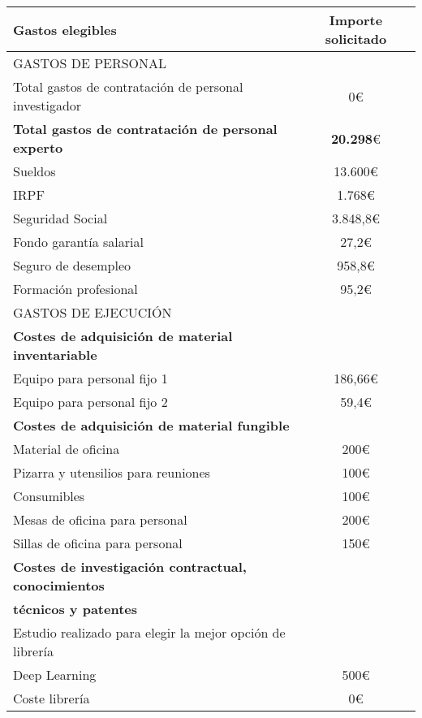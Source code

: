 \begin{table}[H]
	\begin{center}
		\begin{tabular}{|l|c|} \hline
		\cellcolor{red} Gastos elegibles & Importe solicitado \\
		\hline \hline
		\cellcolor[gray]{0.5}GASTOS DE PERSONAL &  \\ \hline
		Total gastos de contratación de personal investigador & 0\euro \\ \hline
		\cellcolor[gray]{0.8} \textbf{Total gastos de contratación de personal experto} & \textbf{20.298}\euro \\ \hline
		Sueldos & 13.600\euro \\ \hline
		IRPF & 1.768\euro \\ \hline
		Seguridad Social & 3.848,8\euro \\ \hline
		Fondo garantía salarial & 27,2\euro \\ \hline
		Seguro de desempleo &  958,8\euro \\ \hline
		Formación profesional & 95,2\euro \\ \hline
		\cellcolor[gray]{0.5}GASTOS DE EJECUCIÓN &  \\ \hline
		\cellcolor[gray]{0.8}\textbf{Costes de adquisición de material inventariable} &  \\ \hline
		Equipo para personal fijo 1 & 186,66\euro  \\ \hline
		Equipo para personal fijo 2 & 59,4\euro \\ \hline
		\cellcolor[gray]{0.8}\textbf{Costes de adquisición de material fungible} &  \\ \hline
		Material de oficina & 200\euro \\ \hline
		Pizarra y utensilios para reuniones & 100\euro \\ \hline
		Consumibles & 100\euro \\ \hline
		Mesas de oficina para personal &  200\euro \\ \hline
		Sillas de oficina para personal &  150\euro \\ \hline
		\cellcolor[gray]{0.8}\textbf{Costes de investigación contractual, conocimientos } \\
		\cellcolor[gray]{0.8}\textbf{técnicos y patentes} & \\ \hline
		Estudio realizado para elegir la mejor opción de librería\\
		Deep Learning & 500\euro   \\ \hline
		Coste librería & 0\euro \\ \hline

\end{tabular}
\end{center}
\end{table}
